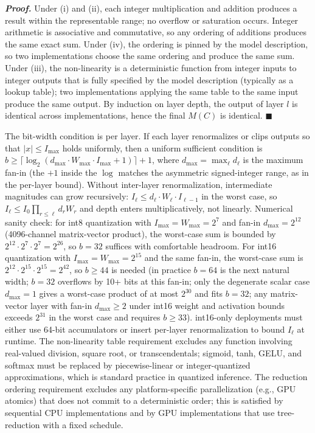 \documentclass[
]{article}
\begin{document}
\emph{\textbf{Proof.}} Under (i) and (ii), each integer multiplication
and addition produces a result within the representable range; no
overflow or saturation occurs. Integer arithmetic is associative and
commutative, so any ordering of additions produces the same exact sum.
Under (iv), the ordering is pinned by the model description, so two
implementations choose the same ordering and produce the same sum.
Under (iii), the non-linearity is a deterministic function from
integer inputs to integer outputs that is fully specified by the model
description (typically as a lookup table); two implementations
applying the same table to the same input produce the same output. By
induction on layer depth, the output of layer $l$ is identical across
implementations, hence the final $M(C)$ is identical.
\hfill$\blacksquare$

The bit-width condition is per layer. If each layer renormalizes or
clips outputs so that $|x| \leq I_{\max}$ holds uniformly, then a
uniform sufficient condition is
$b \geq \lceil \log_2(d_{\max} \cdot W_{\max} \cdot I_{\max} + 1) \rceil + 1$,
where $d_{\max} = \max_\ell d_\ell$ is the maximum fan-in (the $+1$
inside the $\log$ matches the asymmetric signed-integer range, as in
the per-layer bound). Without inter-layer renormalization,
intermediate magnitudes can grow recursively:
$I_\ell \leq d_\ell \cdot W_\ell \cdot I_{\ell-1}$ in the worst
case, so $I_\ell \leq I_0 \prod_{r \leq \ell} d_r W_r$ and depth
enters multiplicatively, not linearly. Numerical sanity check: for
int8 quantization with $I_{\max} = W_{\max} = 2^7$ and fan-in
$d_{\max} = 2^{12}$ (4096-channel matrix-vector product), the
worst-case sum is bounded by $2^{12} \cdot 2^7 \cdot 2^7 = 2^{26}$,
so $b = 32$ suffices with comfortable headroom. For int16
quantization with $I_{\max} = W_{\max} = 2^{15}$ and the same
fan-in, the worst-case sum is $2^{12} \cdot 2^{15} \cdot 2^{15} =
2^{42}$, so $b \geq 44$ is needed (in practice $b = 64$ is the next
natural width; $b = 32$ overflows by 10+ bits at this fan-in;
only the degenerate scalar case $d_{\max} = 1$ gives a worst-case
product of at most $2^{30}$ and fits $b = 32$; any matrix-vector
layer with fan-in $d_{\max} \geq 2$ under int16 weight and
activation bounds exceeds $2^{31}$ in the worst case and requires
$b \geq 33$). int16-only deployments must
either use 64-bit accumulators or insert per-layer renormalization
to bound $I_\ell$ at runtime. The non-linearity table requirement
excludes any function involving real-valued division, square root, or
transcendentals; sigmoid, tanh, GELU, and softmax must be replaced by
piecewise-linear or integer-quantized approximations, which is
standard practice in quantized inference. The reduction ordering
requirement excludes any platform-specific parallelization (e.g., GPU
atomics) that does not commit to a deterministic order; this is
satisfied by sequential CPU implementations and by GPU implementations
that use tree-reduction with a fixed schedule.
\end{document}
